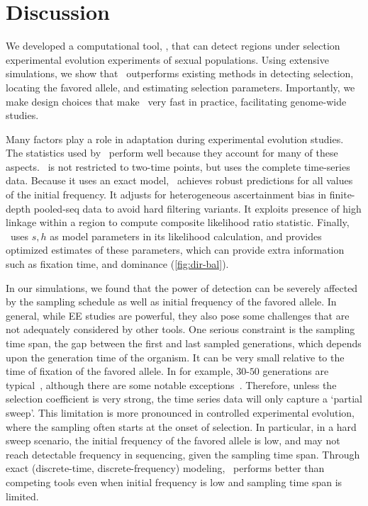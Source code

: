 \section{Discussion}
We developed a computational tool, \comale, that can detect regions
under selection experimental evolution experiments of sexual
populations. Using extensive simulations, we show that \comale\
outperforms existing methods in detecting selection, locating the
favored allele, and estimating selection parameters. Importantly, we
make design choices that make \comale\ very fast in practice,
facilitating genome-wide studies.


Many factors play a role in adaptation during experimental evolution
studies. The statistics used by \comale\ perform well because they
account for many of these aspects. \comale\ is not restricted to
two-time points, but uses the complete time-series data. Because it
uses an exact model, \comale\ achieves robust predictions for all
values of the initial frequency. It adjusts for heterogeneous
ascertainment bias in finite-depth pooled-seq data to avoid hard
filtering variants. It exploits presence of high linkage within a
region to compute composite likelihood ratio statistic. Finally,
\comale\ uses $s,h$ as model parameters in its likelihood calculation,
and provides optimized estimates of these parameters, which can
provide extra information such as fixation time, and dominance 
(\ref{fig:dir-bal}).

In our simulations, we found that the power of detection can be
severely affected by the sampling schedule as well as initial
frequency of the favored allele.  In general, while EE studies are
powerful, they also pose some challenges that are not adequately
considered by other tools. One serious constraint is the sampling time
span, the gap between the first and last sampled generations, which
depends upon the generation time of the organism. It can be very small
relative to the time of fixation of the favored allele. In \dmel for
example, $30$-$50$ generations are typical~\cite{kofler2013guide},
although there are some notable
exceptions~\cite{zhou2011experimental}.  Therefore, unless the
selection coefficient is very strong, the time series data will only
capture a `partial sweep'. This limitation is more pronounced in
controlled experimental evolution, where the sampling often starts at
the onset of selection. In particular, in a hard sweep scenario, the
initial frequency of the favored allele is low, and may not reach
detectable frequency in sequencing, given the sampling time
span. Through exact (discrete-time, discrete-frequency) modeling,
\comale\ performs better than competing tools even when initial
frequency is low and sampling time span is limited.



